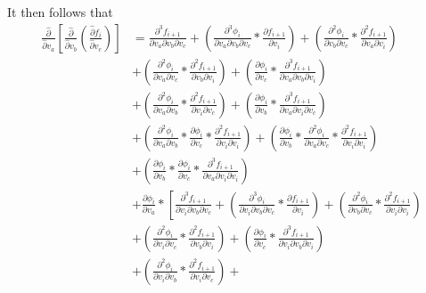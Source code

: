 \documentclass[12pt,letter]{article}
\begin{document}
	It then follows that
	\begin{equation}
	\begin{split}
	\frac{\hat{\partial}}{\hat{\partial}  v_a}\left[\frac{\hat{\partial}}{\hat{\partial} v_b}\left(\frac{\hat{\partial} f_i}{\hat{\partial} v_c}\right)\right] &= 
	\frac{\partial^3 f_{i+1}}{\partial v_a \partial v_b \partial v_c} + 
	\left(\frac{\partial^3 \phi_i}{\partial v_a \partial v_b \partial v_c} * \frac{\partial f_{i+1}}{\partial v_i}\right) + 
	\left(\frac{\partial^2 \phi_i}{\partial v_b \partial v_c} * \frac{\partial^2 f_{i+1}}{\partial v_a \partial v_i}\right) 
	\\
	&+ \left(\frac{\partial^2 \phi_i}{\partial v_a \partial v_c} * \frac{\partial^2 f_{i+1}}{\partial v_b \partial v_i}\right) + 
	\left(\frac{\partial \phi_i}{\partial v_c} * \frac{\partial^3 f_{i+1}}{\partial v_a \partial v_b \partial v_i}\right) 
	\\
	&+ \left(\frac{\partial^2 \phi_i}{\partial v_a \partial v_b} * \frac{\partial^2 f_{i+1}}{\partial v_i \partial v_c}\right) + 
	\left(\frac{\partial \phi_i}{\partial v_b} * \frac{\partial^3 f_{i+1}}{\partial v_a \partial v_i \partial v_c}\right) 
	\\
	&+ \left(\frac{\partial^2 \phi_i}{\partial v_a \partial v_b} * \frac{\partial \phi_i}{\partial v_c} * \frac{\partial^2 f_{i+1}}{\partial v_i \partial v_i}\right) + 
	\left(\frac{\partial \phi_i}{\partial v_b} * \frac{\partial^2 \phi_i}{\partial v_a \partial v_c} * \frac{\partial^2 f_{i+1}}{\partial v_i \partial v_i}\right) 
	\\
	&+ \left(\frac{\partial \phi_i}{\partial v_b} * \frac{\partial \phi_i}{\partial v_c} * \frac{\partial^3 f_{i+1}}{\partial v_a \partial v_i \partial v_i}\right) 
	\\
	&+ \frac{\partial \phi_i}{\partial v_a} * 
	\left[\frac{\partial^3 f_{i+1}}{\partial v_i \partial v_b \partial v_c} + 
	\left(\frac{\partial^3 \phi_i}{\partial v_i \partial v_b \partial v_c} * \frac{\partial f_{i+1}}{\partial v_i}\right) + 
	\left(\frac{\partial^2 \phi_i}{\partial v_b \partial v_c} * \frac{\partial^2 f_{i+1}}{\partial v_i \partial v_i}\right) 
	\right.
	\\
	&\left.
	+ \left(\frac{\partial^2 \phi_i}{\partial v_i \partial v_c} * \frac{\partial^2 f_{i+1}}{\partial v_b \partial v_i}\right) + 
	\left(\frac{\partial \phi_i}{\partial v_c} * \frac{\partial^3 f_{i+1}}{\partial v_i \partial v_b \partial v_i}\right) 
	\right.
	\\
	&\left.
	+ \left(\frac{\partial^2 \phi_i}{\partial v_i \partial v_b} * \frac{\partial^2 f_{i+1}}{\partial v_i \partial v_c}\right) + 

\end{split}
\end{equation}
\end{document}
